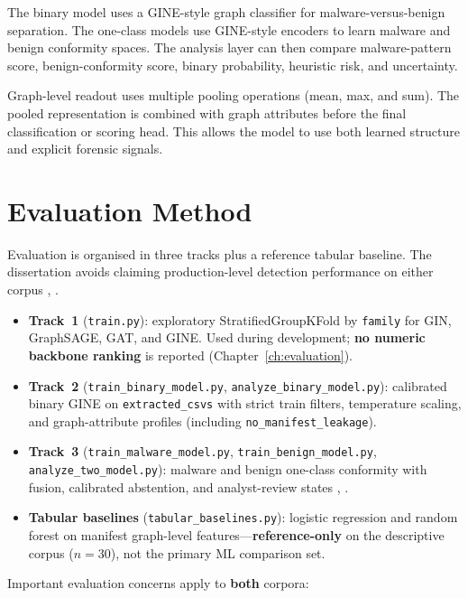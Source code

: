 The binary model uses a GINE-style graph classifier for malware-versus-benign separation. The one-class models use GINE-style encoders to learn malware and benign conformity spaces. The analysis layer can then compare malware-pattern score, benign-conformity score, binary probability, heuristic risk, and uncertainty.

Graph-level readout uses multiple pooling operations (mean, max, and sum). The pooled representation is combined with graph attributes before the final classification or scoring head. This allows the model to use both learned structure and explicit forensic signals.

\section{Evaluation Method}

Evaluation is organised in three tracks plus a reference tabular baseline. The dissertation avoids claiming production-level detection performance on either corpus \cite{sommer2010outside}, \cite{apruzzese2023sok}.

\begin{itemize}
\item \textbf{Track~1} (\texttt{train.py}): exploratory StratifiedGroupKFold by \texttt{family} for GIN, GraphSAGE, GAT, and GINE. Used during development; \textbf{no numeric backbone ranking} is reported (Chapter~\ref{ch:evaluation}).
\item \textbf{Track~2} (\texttt{train\_binary\_model.py}, \texttt{analyze\_binary\_model.py}): calibrated binary GINE on \texttt{extracted\_csvs} with strict train filters, temperature scaling, and graph-attribute profiles (including \texttt{no\_manifest\_leakage}).
\item \textbf{Track~3} (\texttt{train\_malware\_model.py}, \texttt{train\_benign\_model.py}, \texttt{analyze\_two\_model.py}): malware and benign one-class conformity with fusion, calibrated abstention, and analyst-review states \cite{ruff2018deep}, \cite{guo2017calibration}.
\item \textbf{Tabular baselines} (\texttt{tabular\_baselines.py}): logistic regression and random forest on manifest graph-level features---\textbf{reference-only} on the descriptive corpus ($n{=}30$), not the primary ML comparison set.
\end{itemize}

Important evaluation concerns apply to \textbf{both} corpora:

